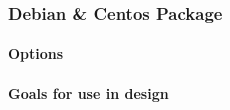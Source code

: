 \subsubsection{Debian \& Centos Package}

\paragraph{Options}


\paragraph{Goals for use in design}

